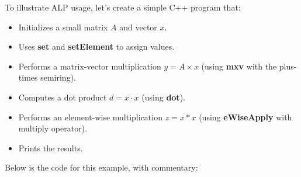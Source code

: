 To illustrate ALP usage, let's create a simple C++ program that:
\begin{itemize}
\item Initializes a small matrix $A$ and vector $x$.
\item Uses \textbf{set} and \textbf{setElement} to assign values.
\item Performs a matrix-vector multiplication $y = A \times x$ (using \textbf{mxv} with the plus-times semiring).
\item Computes a dot product $d = x \cdot x$ (using \textbf{dot}).
\item Performs an element-wise multiplication $z = x * x$ (using \textbf{eWiseApply} with multiply operator).
\item Prints the results.
\end{itemize}

Below is the code for this example, with commentary:

